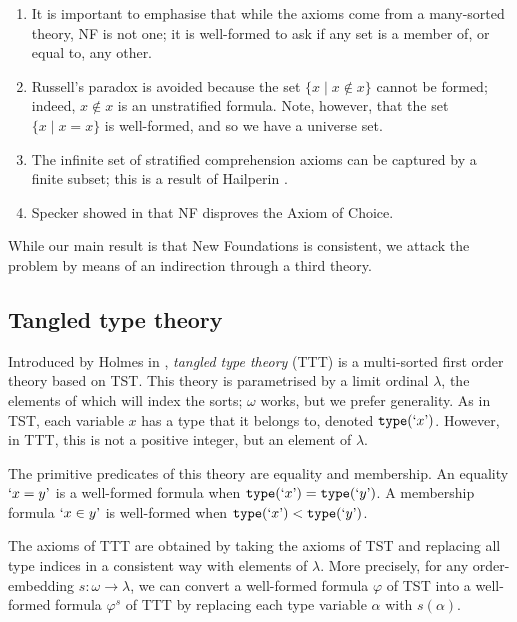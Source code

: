 \begin{remarks}\mbox{\negthinspace}
	\begin{enumerate}
		\item It is important to emphasise that while the axioms come from a many-sorted theory, NF is not one; it is well-formed to ask if any set is a member of, or equal to, any other.
		\item Russell's paradox is avoided because the set \( \{ x \mid x \notin x \} \) cannot be formed; indeed, \( x \notin x \) is an unstratified formula.
		Note, however, that the set \( \{ x \mid x = x \} \) is well-formed, and so we have a universe set.
		\item The infinite set of stratified comprehension axioms can be captured by a finite subset; this is a result of Hailperin \cite{hailperin-finite-axiomatisation}.
		\item Specker showed in \cite{specker-choice-nf} that NF disproves the Axiom of Choice.
	\end{enumerate}
\end{remarks}

While our main result is that New Foundations is consistent, we attack the problem by means of an indirection through a third theory.

\subsection{Tangled type theory}
\label{ss:theories:ttt}

Introduced by Holmes in \cite{holmes-ttt}, \emph{tangled type theory} (TTT) is a multi-sorted first order theory based on TST.
This theory is parametrised by a limit ordinal \( \lambda \), the elements of which will index the sorts; \( \omega \) works, but we prefer generality.
As in TST, each variable \( x \) has a type that it belongs to, denoted \( \texttt{type}(\text{`}x\text{'}) \).
However, in TTT, this is not a positive integer, but an element of \( \lambda \).

The primitive predicates of this theory are equality and membership.
An equality \( \text{`}x = y\text{'} \) is a well-formed formula when \( \texttt{type}(\text{`}x\text{'}) = \texttt{type}(\text{`}y\text{'}) \).
A membership formula \( \text{`}x \in y\text{'} \) is well-formed when \( \texttt{type}(\text{`}x\text{'}) < \texttt{type}(\text{`}y\text{'}) \).

The axioms of TTT are obtained by taking the axioms of TST and replacing all type indices in a consistent way with elements of \( \lambda \).
More precisely, for any order-embedding \( s : \omega \to \lambda \), we can convert a well-formed formula \( \varphi \) of TST into a well-formed formula \( \varphi^s \) of TTT by replacing each type variable \( \alpha \) with \( s(\alpha) \).

